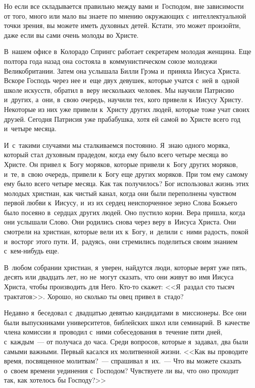 \documentclass[12pt,article,a4paper,fittopage]{ncc}
\begin{document}
\begin{multicols}{2}
Но если все складывается правильно между вами и~Господом, вне зависимости от того, много или мало вы знаете по мнению окружающих с~интеллектуальной точки зрения, вы можете иметь духовных детей. Кстати, это может произойти, даже если вы сами очень молоды во Христе.

В~нашем офисе в~Колорадо Спрингс работает секретарем молодая женщина. Еще полтора года назад она состояла в~коммунистическом союзе молодежи Великобритании. Затем она услышала Билли Грэма и~приняла Иисуса Христа. Вскоре Господь через нее и~еще двух девушек, которые учатся с~ней в~одной школе искусств, обратил в~веру нескольких человек. Мы научили Патрисию и~других, а~они, в~свою очередь, научили тех, кого привели к~Иисусу Христу. Некоторые из них уже привели к~Христу других людей, которые тоже учат своих друзей. Сегодня Патрисия уже прабабушка, хотя ей самой во Христе всего год и~четыре месяца.

И~с~такими случаями мы сталкиваемся постоянно. Я~знаю одного моряка, который стал духовным прадедом, когда ему было всего четыре месяца во Христе. Он привел к~Богу моряков, которые привели к~Богу других моряков, и~те, в~свою очередь, привели к~Богу еще других моряков. При том ему самому ему было всего четыре месяца. Как так получилось? Бог использовал жизнь этих молодых христиан, как чистый канал, когда они были переполнены чувством первой любви к~Иисусу, и~из их сердец неиспорченное зерно Слова Божьего было посеяно в~сердцах других людей. Оно пустило корни. Вера пришла, когда они услышали Слово. Они родились снова через веру в~Иисуса Христа. Они смотрели на христиан, которые вели их к~Богу, и~делили с~ними радость, покой и~восторг этого пути. И,~радуясь, они стремились поделиться своим знанием с~кем-нибудь еще.

В~любом собрании христиан, я~уверен, найдутся люди, которые верят уже пять, десять или двадцать лет, но не~могут сказать, что они живут во имя Иисуса Христа, чтобы производить для Него. Кто-то скажет: <<Я~раздал сто тысяч трактатов>>. Хорошо, но сколько ты овец привел в~стадо?

\pagestyle{lheadings}

Недавно я~беседовал с~двадцатью девятью кандидатами в~миссионеры. Все они были выпускниками университетов, библейских школ или семинарий. В~качестве члена комиссии я~проводил с~ними собеседования в~течение пяти дней, с~каждым~--- от получаса до часа. Среди вопросов, которые я~задавал, два были самыми важными. Первый касался их молитвенной жизни. <<Как вы проводите время, посвященное молитвам?~--- спрашивал я~их.~--- Что вы можете сказать о~своем времени уединения с~Господом? Чувствуете ли вы, что оно проходит так, как хотелось бы Господу?>>


\end{multicols}
\end{document}
